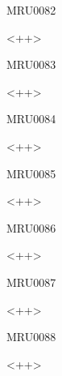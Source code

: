 \documentclass{article}
\begin{document}
\begin{corrige}{MRU0082}

<++>

\end{corrige}%


\begin{corrige}{MRU0083}

<++>

\end{corrige}%


\begin{corrige}{MRU0084}

<++>

\end{corrige}%


\begin{corrige}{MRU0085}

<++>

\end{corrige}%


\begin{corrige}{MRU0086}

<++>

\end{corrige}%


\begin{corrige}{MRU0087}

<++>

\end{corrige}%


\begin{corrige}{MRU0088}

<++>

\end{corrige}%
\end{document}
